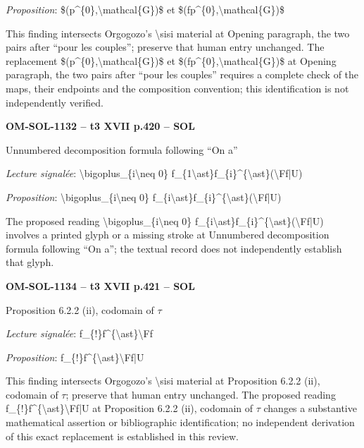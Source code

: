 \emph{Proposition}: \$(p\textasciicircum{}\{0\},\textbackslash{}mathcal\{G\})\$ et \$(fp\textasciicircum{}\{0\},\textbackslash{}mathcal\{G\})\$\par
This finding intersects Orgogozo's \textbackslash{}sisi material at Opening paragraph, the two pairs after “pour les couples”; preserve that human entry unchanged. The replacement \$(p\textasciicircum{}\{0\},\textbackslash{}mathcal\{G\})\$ et \$(fp\textasciicircum{}\{0\},\textbackslash{}mathcal\{G\})\$ at Opening paragraph, the two pairs after “pour les couples” requires a complete check of the maps, their endpoints and the composition convention; this identification is not independently verified.\par
\par\noindent\textbf{OM-SOL-1132 -- t3 XVII p.420 -- SOL}\par
Unnumbered decomposition formula following “On a”\par
\emph{Lecture signalée}: \textbackslash{}bigoplus\_\{i\textbackslash{}neq 0\} f\_\{1\textbackslash{}ast\}f\_\{i\}\textasciicircum{}\{\textbackslash{}ast\}(\textbackslash{}Ff|U)\par
\emph{Proposition}: \textbackslash{}bigoplus\_\{i\textbackslash{}neq 0\} f\_\{i\textbackslash{}ast\}f\_\{i\}\textasciicircum{}\{\textbackslash{}ast\}(\textbackslash{}Ff|U)\par
The proposed reading \textbackslash{}bigoplus\_\{i\textbackslash{}neq 0\} f\_\{i\textbackslash{}ast\}f\_\{i\}\textasciicircum{}\{\textbackslash{}ast\}(\textbackslash{}Ff|U) involves a printed glyph or a missing stroke at Unnumbered decomposition formula following “On a”; the textual record does not independently establish that glyph.\par
\par\noindent\textbf{OM-SOL-1134 -- t3 XVII p.421 -- SOL}\par
Proposition 6.2.2 (ii), codomain of \ensuremath{\tau}\par
\emph{Lecture signalée}: f\_\{!\}f\textasciicircum{}\{\textbackslash{}ast\}\textbackslash{}Ff\par
\emph{Proposition}: f\_\{!\}f\textasciicircum{}\{\textbackslash{}ast\}\textbackslash{}Ff|U\par
This finding intersects Orgogozo's \textbackslash{}sisi material at Proposition 6.2.2 (ii), codomain of \ensuremath{\tau}; preserve that human entry unchanged. The proposed reading f\_\{!\}f\textasciicircum{}\{\textbackslash{}ast\}\textbackslash{}Ff|U at Proposition 6.2.2 (ii), codomain of \ensuremath{\tau} changes a substantive mathematical assertion or bibliographic identification; no independent derivation of this exact replacement is established in this review.\par
